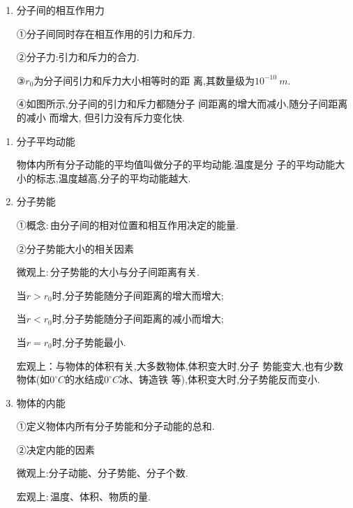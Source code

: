 \begin{enumerate}
\item 
分子间的相互作用力

①分子间同时存在相互作用的引力和斥力.

②分子力:引力和斥力的合力.

③$ r_{0} $为分子间引力和斥力大小相等时的距
离,其数量级为$ 10^{-10}\ m $.

④如图所示,分子间的引力和斥力都随分子
间距离的增大而减小,随分子间距离的减小
而增大, 但引力没有斥力变化快.
\begin{figure}[h!]
\centering
 \qquad \qquad 

\end{figure}



\end{enumerate}












\begin{enumerate}
\renewcommand{\labelenumii}{(\arabic{enumii})}

\item 
分子平均动能

物体内所有分子动能的平均值叫做分子的平均动能.温度是分
子的平均动能大小的标志,温度越高,分子的平均动能越大.

\item 
分子势能

①概念$ : $由分子间的相对位置和相互作用决定的能量.

②分子势能大小的相关因素

微观上$ : $分子势能的大小与分子间距离有关.

当$ r>r_{0} $时,分子势能随分子间距离的增大而增大;

当$ r<r_{0} $时,分子势能随分子间距离的减小而增大;

当$ r=r_{0} $时,分子势能最小.

宏观上：与物体的体积有关,大多数物体,体积变大时,分子
势能变大,也有少数物体(如$ 0 ^{ \circ } C $的水结成$ 0 ^{ \circ } C $冰、铸造铁
等),体积变大时,分子势能反而变小.


\item 
物体的内能

①定义物体内所有分子势能和分子动能的总和.

②决定内能的因素

微观上:分子动能、分子势能、分子个数.

宏观上$ : $温度、体积、物质的量.



\end{enumerate}


